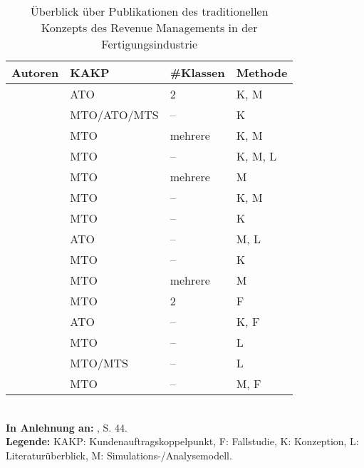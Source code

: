 \begin{table}[h!]
  \begin{center}
    \caption{Überblick über Publikationen des traditionellen Konzepts des Revenue Managements in der Fertigungsindustrie}  \label{Überblick}
    \vspace*{3mm}
    \begin{tabular}{llll}   %
     Autoren & KAKP  & \#Klassen & Methode  \\ \hline
     \cite{deBHarris1995299} &      ATO          &  2  &  K, M \\
      \cite{Kalyan:2002aa}      &      MTO/ATO/MTS          &  --  &  K \\
                \cite{rehkopf:2005aa}   &      MTO          &  mehrere &  K, M \\
                      \cite{rehkopf2007revenue}    &      MTO          &  --  &  K, M, L \\
                               \cite{Spengler:2007aa}   &    MTO            & mehrere & M  \\
                               \cite{Volling20121021} & MTO & -- & K, M \\
          \cite{kimms2005branchenverg} & MTO & -- & K \\
          \cite{guhlich2015revenue} & ATO & -- & M, L \\
          \cite{kolisch2006revenue} & MTO & -- & K \\
              \cite{DECI:DECI074}  &      MTO          &  mehrere  &  M \\
          \cite{kuhn2004revenue} & MTO & 2 & F \\
        \cite{Specht:2008aa} &        ATO    &  --  & K, F  \\
        \cite{quante2009revenue} & MTO & -- & L \\ 
        \cite{cheraghi2010revenue} & MTO/MTS & -- & L \\
        \cite{sucky2009revenue} & MTO & -- & M, F \\ \hline
    \end{tabular} \\[3mm]
    {\footnotesize \textbf{In Anlehnung an:} \cite{quante2009management}, S. 44.}\\
        {\footnotesize \textbf{Legende:} KAKP: Kundenauftragskoppelpunkt, F: Fallstudie, K: Konzeption, L: Literaturüberblick, M: Simulations-/Analysemodell. }   %
  \end{center}
\end{table}

